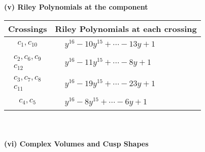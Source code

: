 \documentclass[1p]{elsarticle_modified}
\theoremstyle{definition}
\begin{document}
\newpage\renewcommand{\arraystretch}{1}
\flushleft \textbf{(v) Riley Polynomials at the component}\newline \\
\begin{tabular}{m{50pt}|m{274pt}}
Crossings & \hspace{64pt}Riley Polynomials at each crossing \\
\hline $$\begin{aligned}c_{1},c_{10}\end{aligned}$$&$\begin{aligned}
&y^{16}-10 y^{15}+\cdots-13 y+1
\end{aligned}$\\
\hline $$\begin{aligned}c_{2},c_{6},c_{9}\\c_{12}\end{aligned}$$&$\begin{aligned}
&y^{16}-11 y^{15}+\cdots-8 y+1
\end{aligned}$\\
\hline $$\begin{aligned}c_{3},c_{7},c_{8}\\c_{11}\end{aligned}$$&$\begin{aligned}
&y^{16}-19 y^{15}+\cdots-23 y+1
\end{aligned}$\\
\hline $$\begin{aligned}c_{4},c_{5}\end{aligned}$$&$\begin{aligned}
&y^{16}-8 y^{15}+\cdots-6 y+1
\end{aligned}$\\
\hline
\end{tabular}\\~\\
\newpage\flushleft \textbf{(vi) Complex Volumes and Cusp Shapes}
\end{document}
